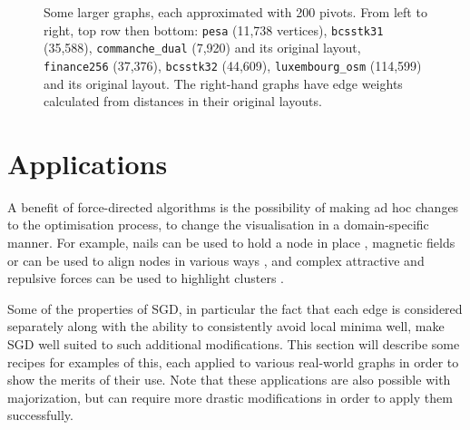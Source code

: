 \begin{figure}
  \centering
  \caption[A gallery of large graphs layed out using sparse stress]{Some larger graphs, each approximated with 200 pivots.
  From left to right, top row then bottom: \texttt{pesa} (11,738 vertices), \texttt{bcsstk31} (35,588), \texttt{commanche\_dual} (7,920) and its original layout, \texttt{finance256} (37,376), \texttt{bcsstk32} (44,609), \texttt{luxembourg\_osm} (114,599) and its original layout. The right-hand graphs have edge weights calculated from distances in their original layouts.
  }
  \label{fig:showcase}
\end{figure}


\section{Applications}
\label{sec:cookbook}
A benefit of force-directed algorithms is the possibility of making ad hoc changes to the optimisation process, to change the visualisation in a domain-specific manner. For example, nails can be used to hold a node in place \cite{Mi2016}, magnetic fields or can be used to align nodes in various ways \cite{Sugiyama1994}, and complex attractive and repulsive forces can be used to highlight clusters \cite{Suh2019}.

Some of the properties of SGD, in particular the fact that each edge is considered separately along with the ability to consistently avoid local minima well, make SGD well suited to such additional modifications. This section will describe some recipes for examples of this, each applied to various real-world graphs in order to show the merits of their use.
Note that these applications are also possible with majorization, but can require more drastic modifications in order to apply them successfully.

